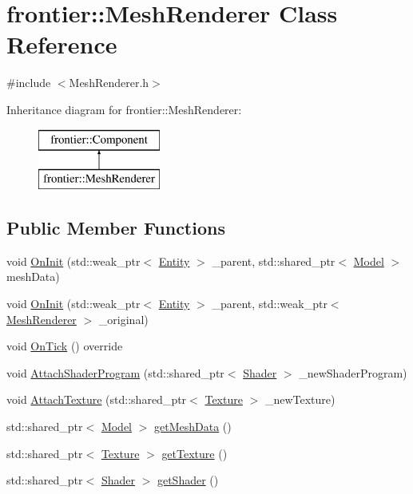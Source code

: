 \hypertarget{classfrontier_1_1_mesh_renderer}{}\section{frontier\+:\+:Mesh\+Renderer Class Reference}
\label{classfrontier_1_1_mesh_renderer}


{\ttfamily \#include $<$Mesh\+Renderer.\+h$>$}

Inheritance diagram for frontier\+:\+:Mesh\+Renderer\+:\begin{figure}[H]
\begin{center}
\leavevmode
\includegraphics[height=2.000000cm]{classfrontier_1_1_mesh_renderer}
\end{center}
\end{figure}
\subsection*{Public Member Functions}
\begin{DoxyCompactItemize}
\item 
void \hyperlink{classfrontier_1_1_mesh_renderer_a4fea1e0ed820ebda7daa4c00f62447e1}{On\+Init} (std\+::weak\+\_\+ptr$<$ \hyperlink{classfrontier_1_1_entity}{Entity} $>$ \+\_\+parent, std\+::shared\+\_\+ptr$<$ \hyperlink{classfrontier_1_1_model}{Model} $>$ mesh\+Data)
\item 
void \hyperlink{classfrontier_1_1_mesh_renderer_a27e5a0fdf24ffdae6555f2d132adf3f4}{On\+Init} (std\+::weak\+\_\+ptr$<$ \hyperlink{classfrontier_1_1_entity}{Entity} $>$ \+\_\+parent, std\+::weak\+\_\+ptr$<$ \hyperlink{classfrontier_1_1_mesh_renderer}{Mesh\+Renderer} $>$ \+\_\+original)
\item 
void \hyperlink{classfrontier_1_1_mesh_renderer_acffde7174ddb009751e360df5d346922}{On\+Tick} () override
\item 
void \hyperlink{classfrontier_1_1_mesh_renderer_a8be0a3e04dc5c9e56e230c914e58c2dc}{Attach\+Shader\+Program} (std\+::shared\+\_\+ptr$<$ \hyperlink{classfrontier_1_1_shader}{Shader} $>$ \+\_\+new\+Shader\+Program)
\item 
void \hyperlink{classfrontier_1_1_mesh_renderer_a5c915d5fba6a56841afe98123e8cfa5d}{Attach\+Texture} (std\+::shared\+\_\+ptr$<$ \hyperlink{classfrontier_1_1_texture}{Texture} $>$ \+\_\+new\+Texture)
\item 
std\+::shared\+\_\+ptr$<$ \hyperlink{classfrontier_1_1_model}{Model} $>$ \hyperlink{classfrontier_1_1_mesh_renderer_a8e2841ee4567339e2f177fa638ba94ae}{get\+Mesh\+Data} ()
\item 
std\+::shared\+\_\+ptr$<$ \hyperlink{classfrontier_1_1_texture}{Texture} $>$ \hyperlink{classfrontier_1_1_mesh_renderer_a73b46e36c38ef65b28506c99d7d23cc1}{get\+Texture} ()
\item 
std\+::shared\+\_\+ptr$<$ \hyperlink{classfrontier_1_1_shader}{Shader} $>$ \hyperlink{classfrontier_1_1_mesh_renderer_a09c2ffc4ae2f5ea31e13357ce8a8486e}{get\+Shader} ()
\end{DoxyCompactItemize}
